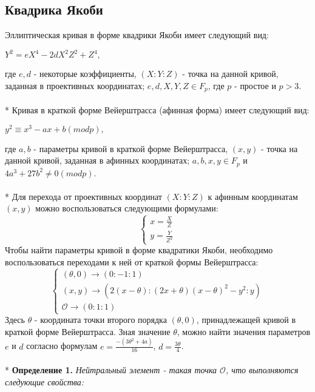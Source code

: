 \documentclass[12pt]{article}
\begin{document}
\subsection{Квадрика Якоби}
Эллиптическая кривая в форме квадрики Якоби имеет следующий вид:
\begin{center}
$Y^2 = eX^4 - 2dX^2Z^2 + Z^4,$
\end{center}
где $e, d$ - некоторые коэффициенты, $(X : Y : Z)$ - точка на данной кривой, заданная в проективных координатах; $e, d, X, Y, Z \in F_p$, где $p$ - простое и $p > 3$. \\
\\*
Кривая в краткой форме Вейерштрасса (афинная форма) имеет следующий вид:
\begin{center}
$y^2 \equiv x^3 - ax + b (mod p),$
\end{center}
где $a, b$ - параметры кривой в краткой форме Вейерштрасса, $(x, y)$ - точка на данной кривой, заданная в афинных координатах; $a, b, x, y \in F_p$ и $4a^3 + 27b^2 \neq 0 (mod p)$.\\
\\*
Для перехода от проективных координат $(X : Y : Z)$ к афинным координатам $(x, y)$ можно воспользоваться следующими формулами: \\
\begin{equation*}
\begin{cases}
x = \frac{X}{Z}
\\
y = \frac{Y}{Z^2}
\end{cases}
\end{equation*}
Чтобы найти параметры кривой в форме квадратики Якоби, необходимо воспользоваться переходами к ней от краткой формы Вейерштрасса:
\begin{equation*}
\begin{cases}
(\theta, 0) \rightarrow (0 : -1 : 1)
\\
(x, y) \rightarrow (2(x - \theta) : (2x + \theta)(x - \theta)^2 - y^2 : y)
\\
\mathcal{O} \rightarrow (0 : 1 : 1)
\end{cases}
\end{equation*}
Здесь $\theta$ - координата точки второго порядка $(\theta, 0)$, принадлежащей кривой в краткой форме Вейерштрасса. Зная значение $\theta$, можно найти значения параметров $e$ и $d$ согласно формулам $e = \frac{-(3\theta^2 + 4a)}{16}$, $d = \frac{3\theta}{4}$.\\
\\*
\textbf{Определение 1.} \textit{Нейтральный элемент - такая точка $\mathcal{O}$, что выполняются следующие свойства:}
\end{document}
